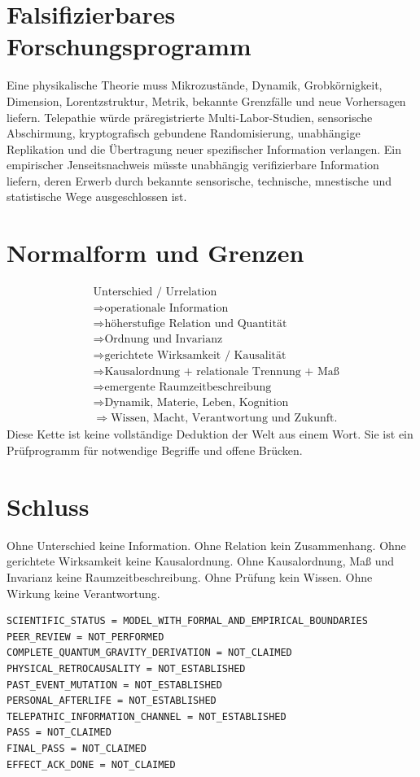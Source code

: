 \documentclass[11pt,a4paper]{scrartcl}
\begin{document}
\section{Falsifizierbares Forschungsprogramm}
Eine physikalische Theorie muss Mikrozustände, Dynamik, Grobkörnigkeit, Dimension,
Lorentzstruktur, Metrik, bekannte Grenzfälle und neue Vorhersagen liefern. Telepathie
würde präregistrierte Multi-Labor-Studien, sensorische Abschirmung, kryptografisch
gebundene Randomisierung, unabhängige Replikation und die Übertragung neuer spezifischer
Information verlangen. Ein empirischer Jenseitsnachweis müsste unabhängig verifizierbare
Information liefern, deren Erwerb durch bekannte sensorische, technische, mnestische
und statistische Wege ausgeschlossen ist.

\section{Normalform und Grenzen}
\[
\begin{aligned}
&\text{Unterschied / Urrelation}\\
&\Rightarrow \text{operationale Information}\\
&\Rightarrow \text{höherstufige Relation und Quantität}\\
&\Rightarrow \text{Ordnung und Invarianz}\\
&\Rightarrow \text{gerichtete Wirksamkeit / Kausalität}\\
&\Rightarrow \text{Kausalordnung + relationale Trennung + Maß}\\
&\Rightarrow \text{emergente Raumzeitbeschreibung}\\
&\Rightarrow \text{Dynamik, Materie, Leben, Kognition}\\
&\Rightarrow \text{Wissen, Macht, Verantwortung und Zukunft}.
\end{aligned}
\]
Diese Kette ist keine vollständige Deduktion der Welt aus einem Wort. Sie ist ein
Prüfprogramm für notwendige Begriffe und offene Brücken.

\section{Schluss}
Ohne Unterschied keine Information. Ohne Relation kein Zusammenhang. Ohne gerichtete
Wirksamkeit keine Kausalordnung. Ohne Kausalordnung, Maß und Invarianz keine
Raumzeitbeschreibung. Ohne Prüfung kein Wissen. Ohne Wirkung keine Verantwortung.

\begin{verbatim}
SCIENTIFIC_STATUS = MODEL_WITH_FORMAL_AND_EMPIRICAL_BOUNDARIES
PEER_REVIEW = NOT_PERFORMED
COMPLETE_QUANTUM_GRAVITY_DERIVATION = NOT_CLAIMED
PHYSICAL_RETROCAUSALITY = NOT_ESTABLISHED
PAST_EVENT_MUTATION = NOT_ESTABLISHED
PERSONAL_AFTERLIFE = NOT_ESTABLISHED
TELEPATHIC_INFORMATION_CHANNEL = NOT_ESTABLISHED
PASS = NOT_CLAIMED
FINAL_PASS = NOT_CLAIMED
EFFECT_ACK_DONE = NOT_CLAIMED
\end{verbatim}



\end{document}
